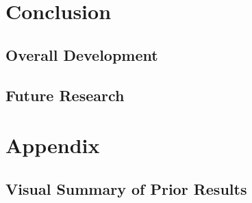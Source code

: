 \documentclass[12pt]{article}
\begin{document}
\section{Conclusion}



\subsection{Overall Development}












\subsection{Future Research}







\section*{Appendix}

\subsection*{Visual Summary of Prior Results} 
\end{document}

